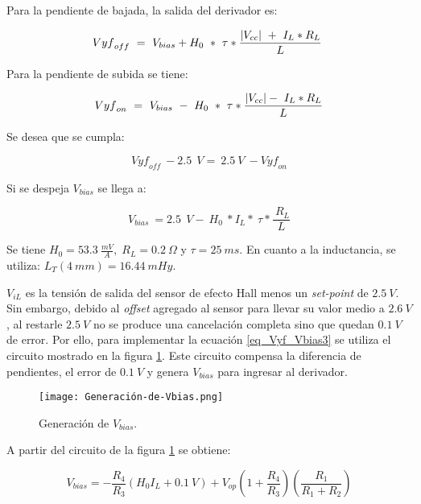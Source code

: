 Para la pendiente de bajada, la salida del derivador es:

\begin{equation} \label{eq_Vyf-Vbias}
	{Vyf}_{off}\ =\ V_{bias}+H_0\ *\ \tau *\frac{\abs{V_{cc}}\ +\ I_L*R_L}{L}\ 
\end{equation}

Para la pendiente de subida se tiene:

\begin{equation} \label{eq_Vyf-Vbias2}
	{Vyf}_{on}\ =\ V_{bias}\ -\ H_0\ *\ \tau *\frac{\abs{V_{cc}} -\ I_L*R_L}{L}
\end{equation}

Se desea que se cumpla:

\begin{equation} \label{eq_Vyf_Vbias3}
	{Vyf}_{off}\ -2.5\ \:V=\ 2.5\ V\ -{Vyf}_{on}
\end{equation}

Si se despeja $V_{bias}$ se llega a:

\begin{equation} \label{eq_Vyf-Vbias4}
	V_{bias}\ =2.5\ \:V -\ H_0\ *I_L*\ \tau *\frac{\ R_L}{L}
\end{equation}

Se tiene $H_0 = 53.3\:\frac{mV}{A},\; R_L = 0.2\:\Omega$ y $\tau  = 25 \:ms$. En cuanto a la inductancia, se utiliza:  $L_T(4\:mm) = 16.44\:mHy$.

$V_{iL}$ es la tensión de salida del sensor de efecto Hall menos un \textsl{set-point} de $2.5\:V$. Sin embargo, debido al \textsl{offset} agregado al sensor para llevar su valor medio a $2.6\:V$, al restarle $2.5\:V$ no se produce una cancelación completa sino que quedan $0.1\:V$ de error. Por ello, para implementar la ecuación  \ref{eq_Vyf_Vbias3} se utiliza el circuito mostrado en la figura \ref{fig:img_Generación_de_Vbias}. Este circuito compensa la diferencia de pendientes, el error de $0.1\:V$ y genera $V_{bias}$ para ingresar al derivador.

\begin{figure}[H]
	\centering
	\texttt{[image: Generación-de-Vbias.png]}
	\caption{Generación de $V_{bias}$.}
	\label{fig:img_Generación_de_Vbias}
\end{figure}

A partir del circuito de la figura \ref{fig:img_Generación_de_Vbias} se obtiene:

\begin{equation} \label{eq_Vyf-Vbias3}
	V_{bias} =-\frac{R_4}{R_3}(H_0I_L+ 0.1\:V)+V_{op}(1+\frac{ R_4}{R_3})(\frac{R_1}{R_1+R_2})
\end{equation}

